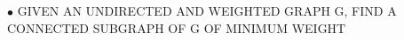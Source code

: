 \documentclass[preview]{standalone}
\begin{document}
\begin{center}
$\bullet$ GIVEN   AN   UNDIRECTED   AND   WEIGHTED   GRAPH   G,   FIND   A   CONNECTED   SUBGRAPH   OF   G   OF   MINIMUM   WEIGHT
\end{center}
\end{document}

